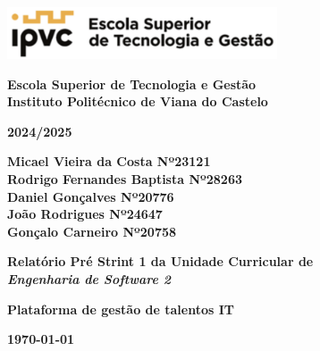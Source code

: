 \documentclass{article}
\begin{document}

\begin{titlepage}
    \begin{center}
        \includegraphics[width=0.6\textwidth]{imagens/estg.png} \vspace{1.5cm}
        
        \textbf{\Large Escola Superior de Tecnologia e Gestão \\ Instituto Politécnico de Viana do Castelo} \vspace{2cm}
        
        \textbf{\Large 2024/2025} \vspace{1.5cm}
        
       \textbf{Micael Vieira da Costa  Nº23121 \\ Rodrigo Fernandes Baptista  Nº28263 \\ Daniel Gonçalves  Nº20776 \\ João Rodrigues Nº24647 \\ Gonçalo Carneiro Nº20758} \vspace{1.2cm}
                                                                                          
        \textbf{\Large Relatório Pré Strint 1 da Unidade Curricular de \\ \textit{Engenharia de Software 2}} \vspace{1.5cm}
        
        \textbf{\Large Plataforma de gestão de talentos IT} \vspace{4cm}
        
        \textbf{\today}
    \end{center}
\end{titlepage}

\renewcommand*\contentsname{Índice}
\tableofcontents
\newpage
\newpage

\end{document}
